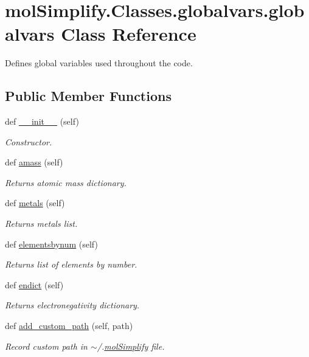 \hypertarget{classmolSimplify_1_1Classes_1_1globalvars_1_1globalvars}{}\section{mol\+Simplify.\+Classes.\+globalvars.\+globalvars Class Reference}
\label{classmolSimplify_1_1Classes_1_1globalvars_1_1globalvars}


Defines global variables used throughout the code.  


\subsection*{Public Member Functions}
\begin{DoxyCompactItemize}
\item 
def \hyperlink{classmolSimplify_1_1Classes_1_1globalvars_1_1globalvars_ab32a1ccd10b2f28a8d13b60b9a394d04}{\+\_\+\+\_\+init\+\_\+\+\_\+} (self)
\begin{DoxyCompactList}\small\item\em Constructor. \end{DoxyCompactList}\item 
def \hyperlink{classmolSimplify_1_1Classes_1_1globalvars_1_1globalvars_a3445aa2f86c723616f75e37c9fb8e648}{amass} (self)
\begin{DoxyCompactList}\small\item\em Returns atomic mass dictionary. \end{DoxyCompactList}\item 
def \hyperlink{classmolSimplify_1_1Classes_1_1globalvars_1_1globalvars_a673cd53d924bdfef605d520b8c2ab3a8}{metals} (self)
\begin{DoxyCompactList}\small\item\em Returns metals list. \end{DoxyCompactList}\item 
def \hyperlink{classmolSimplify_1_1Classes_1_1globalvars_1_1globalvars_a056773e84caa30b9ef6bb482f7ebd68d}{elementsbynum} (self)
\begin{DoxyCompactList}\small\item\em Returns list of elements by number. \end{DoxyCompactList}\item 
def \hyperlink{classmolSimplify_1_1Classes_1_1globalvars_1_1globalvars_a624f761230e8d21715ab233d96991398}{endict} (self)
\begin{DoxyCompactList}\small\item\em Returns electronegativity dictionary. \end{DoxyCompactList}\item 
def \hyperlink{classmolSimplify_1_1Classes_1_1globalvars_1_1globalvars_aff51debc89dfec45719516008d400cd4}{add\+\_\+custom\+\_\+path} (self, path)
\begin{DoxyCompactList}\small\item\em Record custom path in $\sim$/.\hyperlink{namespacemolSimplify}{mol\+Simplify} file. \end{DoxyCompactList}\end{DoxyCompactItemize}
